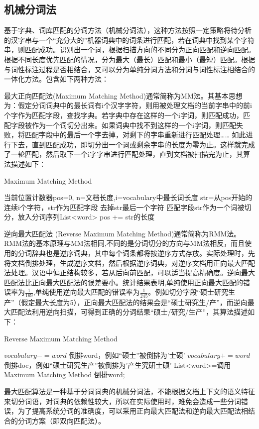 \subsection{机械分词法}
\par 基于字典、词库匹配的分词方法（机械分词法），这种方法按照一定策略将待分析的汉字串与一个“充分大的”机器词典中的词条进行匹配，若在词典中找到某个字符串，则匹配成功。识别出一个词，根据扫描方向的不同分为正向匹配和逆向匹配。根据不同长度优先匹配的情况，分为最大（最长）匹配和最小（最短）匹配。根据与词性标注过程是否相结合，又可以分为单纯分词方法和分词与词性标注相结合的一体化方法。包含如下两种方法：
\par 最大正向匹配法(Maximum Matching Method)通常简称为MM法。其基本思想为：假定分词词典中的最长词有i个汉字字符，则用被处理文档的当前字串中的前i个字作为匹配字段，查找字典。若字典中存在这样的一个i字词，则匹配成功，匹配字段被作为一个词切分出来。如果词典中找不到这样的一个i字词，则匹配失败，将匹配字段中的最后一个字去掉，对剩下的字串重新进行匹配处理……  如此进行下去，直到匹配成功，即切分出一个词或剩余字串的长度为零为止。这样就完成了一轮匹配，然后取下一个i字字串进行匹配处理，直到文档被扫描完为止，其算法描述如下：
\begin{algorithm}
\caption{Maximum Matching Method}
当前位置计数器pos=0, n=文档长度,i=vocabulary中最长词长度\;
 {
str=从pos开始的连续i个字符，str作为匹配字段\;
 {
去掉str最后一个字符\;
}
 {
匹配字段str作为一个词被切分，放入分词序列List<word>\;
pos += str的长度\;
}
}
\end{algorithm}
\par 逆向最大匹配法 (Reverse Maximum Matching Method)通常简称为RMM法。RMM法的基本原理与MM法相同,不同的是分词切分的方向与MM法相反，而且使用的分词辞典也是逆序词典，其中每个词条都将按逆序方式存放。实际处理时，先将文档倒排处理，生成逆序文档，然后根据逆序词典，对逆序文档用正向最大匹配法处理。汉语中偏正结构较多，若从后向前匹配，可以适当提高精确度。逆向最大匹配法比正向最大匹配法的误差要小。统计结果表明,单纯使用正向最大匹配的错误率为$\frac{1}{169}$,单纯使用逆向最大匹配的错误率为$\frac{1}{245}$。例如切分字段“硕士研究生产”（假定最大长度为5），正向最大匹配法的结果会是“硕士研究生/产”，而逆向最大匹配法利用逆向扫描，可得到正确的分词结果“硕士/研究/生产”，其算法描述如下：
\begin{algorithm}
\caption{Reverse Maximum Matching Method}
 {
$vocabulary -= word$\;
倒排word，例如“硕士”被倒排为'士硕'\;
$vocabulary += word$\;
}
倒排doc，例如“硕士研究生产”被倒排为'产生究研士硕'\;
List<word>=调用Maximum Matching Method\;
 {
倒排word;
}
\end{algorithm}
\par 最大匹配算法是一种基于分词词典的机械分词法，不能根据文档上下文的语义特征来切分词语，对词典的依赖性较大，所以在实际使用时，难免会造成一些分词错误，为了提高系统分词的准确度，可以采用正向最大匹配法和逆向最大匹配法相结合的分词方案（即双向匹配法）。
